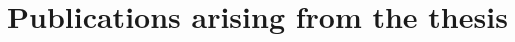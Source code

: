 \chapter*{Publications arising from the thesis}

\bigskip

\begin{refsection}
\nocite{doe2020publication, doe2021another}

\printbibliography[heading = none]
\end{refsection}